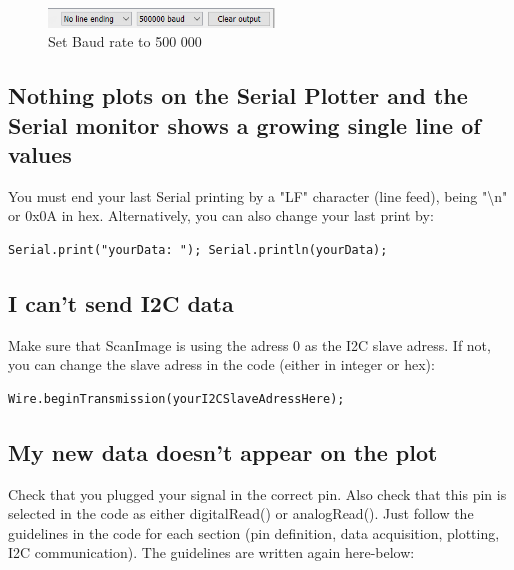 \documentclass[a4paper]{article}
\begin{document}
\begin{figure}[h!b!t!]
    \centering
    \includegraphics[width = 6cm]{images/baud.PNG}
    \caption{Set Baud rate to 500 000}
    \label{fig:baud}
\end{figure}

\subsection{Nothing plots on the Serial Plotter and the Serial monitor shows a growing single line of values}
You must end your last Serial printing by a "LF" character (line feed), being "\textbackslash n" or 0x0A in hex. Alternatively, you can also change your last print by: 
\begin{lstlisting}
Serial.print("yourData: "); Serial.println(yourData);
\end{lstlisting}


\subsection{I can't send I2C data}
Make sure that ScanImage is using the adress 0 as the I2C slave adress.
If not, you can change the slave adress in the code (either in integer or hex):
\begin{lstlisting}
Wire.beginTransmission(yourI2CSlaveAdressHere);
\end{lstlisting}


\subsection{My new data doesn't appear on the plot}
Check that you plugged your signal in the correct pin. Also check that this pin is selected in the code as either digitalRead() or analogRead(). Just follow the guidelines in the code for each section (pin definition, data acquisition, plotting, I2C communication). The guidelines are written again here-below:
\end{document}
